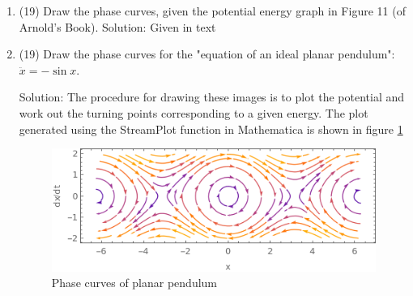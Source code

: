 \begin{enumerate}
\item (19) Draw the phase curves, given the potential energy graph in Figure 11 (of Arnold's Book).
Solution: Given in text
\item (19) Draw the phase curves for the "equation of an ideal planar pendulum": $\ddot{x} = -\sin x$.\par
Solution: The procedure for drawing these images is to plot the potential and work out the turning points corresponding to a given energy. The plot generated using the StreamPlot function in Mathematica is shown in figure \ref{fig:2pendulumstream}
\begin{figure}
	\centering
	\includegraphics[width=0.7\linewidth]{2_pendulumstream}
	\caption{Phase curves of planar pendulum}
	\label{fig:2pendulumstream}
\end{figure}


\end{enumerate}
